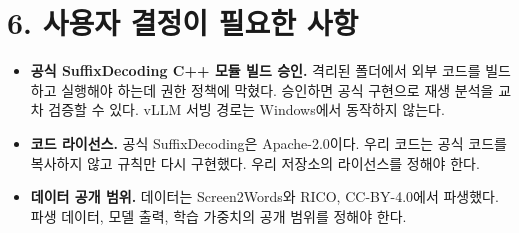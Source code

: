 \documentclass[10pt,a4paper]{article}
\begin{document}
\section*{6. 사용자 결정이 필요한 사항}
\begin{itemize}[leftmargin=1.2em]
\item \textbf{공식 SuffixDecoding C++ 모듈 빌드 승인.} 격리된 폴더에서 외부 코드를 빌드하고 실행해야 하는데 권한 정책에 막혔다. 승인하면 공식 구현으로 재생 분석을 교차 검증할 수 있다. vLLM 서빙 경로는 Windows에서 동작하지 않는다.
\item \textbf{코드 라이선스.} 공식 SuffixDecoding은 Apache-2.0이다. 우리 코드는 공식 코드를 복사하지 않고 규칙만 다시 구현했다. 우리 저장소의 라이선스를 정해야 한다.
\item \textbf{데이터 공개 범위.} 데이터는 Screen2Words와 RICO, CC-BY-4.0에서 파생했다. 파생 데이터, 모델 출력, 학습 가중치의 공개 범위를 정해야 한다.
\end{itemize}
\end{document}
